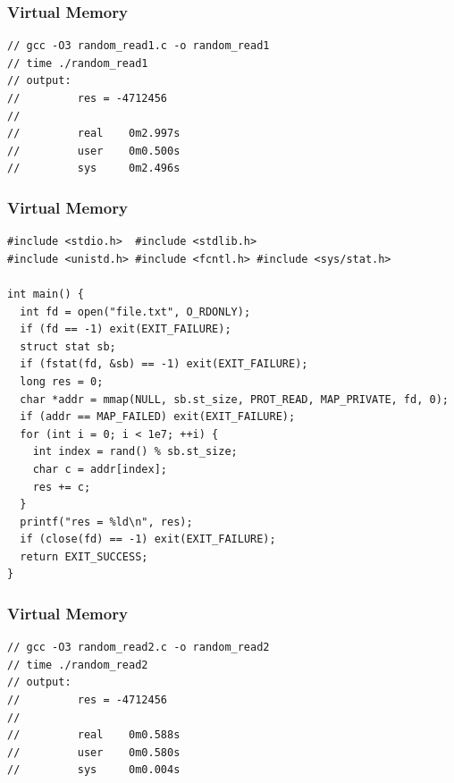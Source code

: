 \documentclass{beamer}
\begin{document}
\begin{frame}[fragile]
\frametitle{Virtual Memory}
\scriptsize
\begin{lstlisting}
// gcc -O3 random_read1.c -o random_read1
// time ./random_read1
// output:
//         res = -4712456
//
//         real    0m2.997s
//         user    0m0.500s
//         sys     0m2.496s
\end{lstlisting}

\end{frame}

\begin{frame}[fragile]
\frametitle{Virtual Memory}
\scriptsize
\begin{lstlisting}[linebackgroundcolor={\lstcolorlines{5,10,14}}]
#include <stdio.h>  #include <stdlib.h>
#include <unistd.h> #include <fcntl.h> #include <sys/stat.h>

int main() {
  int fd = open("file.txt", O_RDONLY);
  if (fd == -1) exit(EXIT_FAILURE);
  struct stat sb;
  if (fstat(fd, &sb) == -1) exit(EXIT_FAILURE);
  long res = 0;
  char *addr = mmap(NULL, sb.st_size, PROT_READ, MAP_PRIVATE, fd, 0);
  if (addr == MAP_FAILED) exit(EXIT_FAILURE);
  for (int i = 0; i < 1e7; ++i) {
    int index = rand() % sb.st_size;
    char c = addr[index];
    res += c;
  }
  printf("res = %ld\n", res);
  if (close(fd) == -1) exit(EXIT_FAILURE);
  return EXIT_SUCCESS;
}
\end{lstlisting}

\end{frame}

\begin{frame}[fragile]
\frametitle{Virtual Memory}
\scriptsize
\begin{lstlisting}
// gcc -O3 random_read2.c -o random_read2
// time ./random_read2
// output:
//         res = -4712456
//
//         real    0m0.588s
//         user    0m0.580s
//         sys     0m0.004s
\end{lstlisting}

\end{frame}



\end{document}

